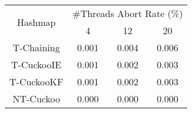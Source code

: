 \begin{tabular}{|c|c|c|c|}
\hline
\multirow{2}{*}{Hashmap} & \multicolumn{3}{c|}{\#Threads Abort Rate (\%)}\\\cline{2-4}& 4 & 12 & 20\\
\hline
\hline
T-Chaining & 0.001 & 0.004 & 0.006\\
T-CuckooIE & 0.001 & 0.002 & 0.003\\
T-CuckooKF & 0.001 & 0.002 & 0.003\\
NT-Cuckoo & 0.000 & 0.000 & 0.000\\
\hline
\end{tabular}

